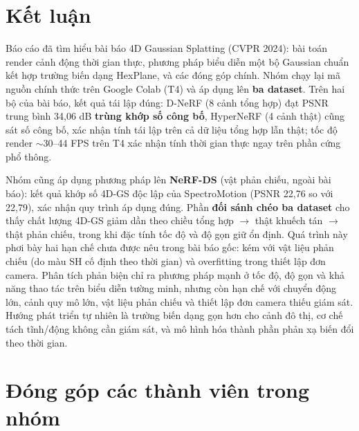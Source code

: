 \documentclass[a4paper]{report}
\begin{document}
\chapter{Kết luận}

Báo cáo đã tìm hiểu bài báo 4D Gaussian Splatting (CVPR 2024): bài toán render
cảnh động thời gian thực, phương pháp biểu diễn một bộ Gaussian chuẩn kết hợp
trường biến dạng HexPlane, và các đóng góp chính. Nhóm chạy lại mã nguồn chính
thức trên Google Colab (T4) và áp dụng lên \textbf{ba dataset}. Trên hai bộ của
bài báo, kết quả tái lập đúng: D-NeRF (8 cảnh tổng hợp) đạt PSNR trung bình
34,06 dB \textbf{trùng khớp số công bố}, HyperNeRF (4 cảnh thật) cũng sát số công
bố, xác nhận tính tái lập trên cả dữ liệu tổng hợp lẫn thật; tốc độ render
$\sim$30--44 FPS trên T4 xác nhận tính thời gian thực ngay trên phần cứng phổ thông.

Nhóm cũng áp dụng phương pháp lên \textbf{NeRF-DS} (vật phản chiếu, ngoài bài báo): kết quả
khớp số 4D-GS độc lập của SpectroMotion (PSNR 22,76 so với 22,79), xác nhận quy trình áp dụng đúng.
Phần \textbf{đối sánh chéo ba dataset} cho thấy chất lượng 4D-GS giảm dần theo chiều
tổng hợp $\to$ thật khuếch tán $\to$ thật phản chiếu, trong khi đặc tính tốc độ và
độ gọn giữ ổn định. Quá trình này phơi bày hai hạn chế chưa được nêu trong bài báo
gốc: kém với vật liệu phản chiếu (do màu SH cố định theo thời gian) và overfitting
trong thiết lập đơn camera. Phân tích phản biện chỉ ra phương pháp mạnh ở tốc độ,
độ gọn và khả năng thao tác trên biểu diễn tường minh, nhưng còn hạn chế với chuyển
động lớn, cảnh quy mô lớn, vật liệu phản chiếu và thiết lập đơn camera thiếu giám
sát. Hướng phát triển tự nhiên là trường biến dạng gọn hơn cho cảnh đô thị, cơ chế
tách tĩnh/động không cần giám sát, và mô hình hóa thành phần phản xạ biến đổi theo
thời gian.

\chapter*{Đóng góp các thành viên trong nhóm}
{}
\end{document}
